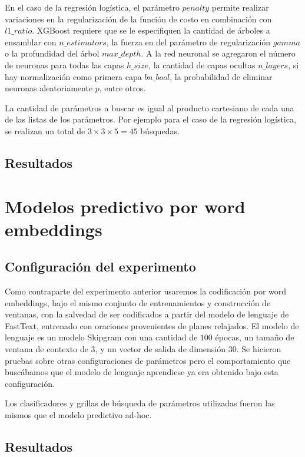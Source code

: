 En el caso de la regresión logística, el parámetro $penalty$ permite realizar variaciones en la regularización de la función de costo en combinación con $l1\_ratio$. XGBoost requiere que se le especifiquen la cantidad de árboles a ensamblar con $n\_estimators$, la fuerza en del parámetro de regularización $gamma$ o la profundidad del árbol $max\_depth$. A la red neuronal se agregaron el número de neuronas para todas las capas $h\_size$, la cantidad de capas ocultas $n\_layers$, si hay normalización como primera capa $bn\_bool$, la probabilidad de eliminar neuronas aleatoriamente $p$, entre otros.

La cantidad de parámetros a buscar es igual al producto cartesiano de cada una de las listas de los parámetros. Por ejemplo para el caso de la regresión logística, se realizan un total de $3 \times 3 \times 5 = 45$ búsquedas.

\subsection{Resultados}

\section{Modelos predictivo por word embeddings}
\label{exp:wb}

\subsection{Configuración del experimento}

Como contraparte del experimento anterior usaremos la codificación por word embeddings, bajo el mismo conjunto de entrenamientos y construcción de ventanas, con la salvedad de ser codificados a partir del modelo de lenguaje de FastText, entrenado con oraciones provenientes de planes relajados. El modelo de lenguaje es un modelo Skipgram con una cantidad de $100$ épocas, un tamaño de ventana de contexto de $3$, y un vector de salida de dimensión $30$. Se hicieron pruebas sobre otras configuraciones de parámetros pero el comportamiento que buscábamos que el modelo de lenguaje aprendiese ya era obtenido bajo esta configuración.

Los clasificadores y grillas de búsqueda de parámetros utilizadas fueron las mismos que el modelo predictivo ad-hoc.

\subsection{Resultados}

